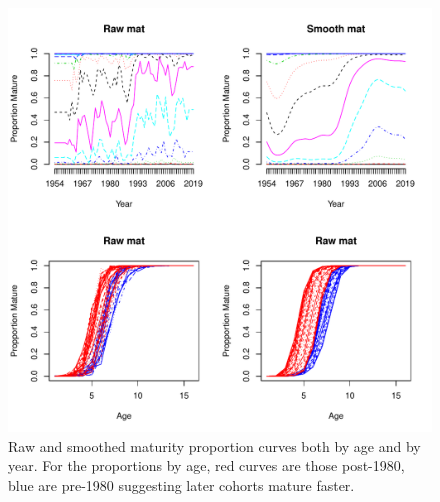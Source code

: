 \documentclass[11pt]{article}\usepackage[]{graphicx}\usepackage[]{color}
\makeatletter
\def\maxwidth{ %
  \ifdim\Gin@nat@width>\linewidth
    \linewidth
  \else
    \Gin@nat@width
  \fi
}
\newenvironment{knitrout}{}{} %
\makeatother
\begin{document}
\begin{knitrout}
\color{fgcolor}\begin{figure}
\includegraphics[width=\maxwidth]{figure/matFPCAp-1} \caption[Raw and smoothed maturity proportion curves both by age and by year]{Raw and smoothed maturity proportion curves both by age and by year. For the proportions by age, red curves are those post-1980, blue are pre-1980 suggesting later cohorts mature faster.}\label{fig:matFPCAp}
\end{figure}


\end{knitrout}
\end{document}
